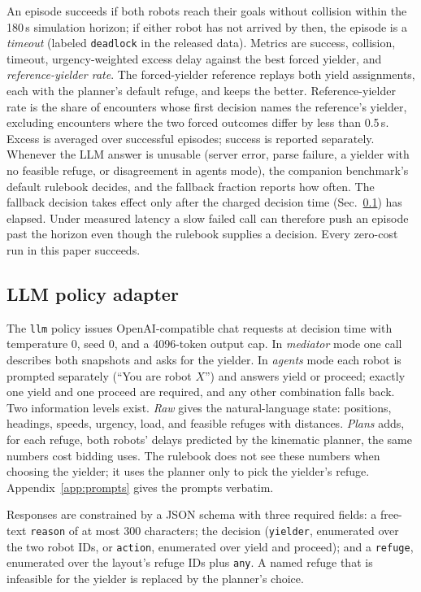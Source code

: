 \documentclass[journal]{IEEEtran}
\begin{document}
An episode succeeds if both robots reach their goals without collision within the 180\,s simulation horizon; if either robot has not arrived by then, the episode is a \emph{timeout} (labeled \texttt{deadlock} in the released data). Metrics are success, collision, timeout, urgency-weighted excess delay against the best forced yielder, and \emph{reference-yielder rate}. The forced-yielder reference replays both yield assignments, each with the planner's default refuge, and keeps the better. Reference-yielder rate is the share of encounters whose first decision names the reference's yielder, excluding encounters where the two forced outcomes differ by less than 0.5\,s. Excess is averaged over successful episodes; success is reported separately. Whenever the LLM answer is unusable (server error, parse failure, a yielder with no feasible refuge, or disagreement in agents mode), the companion benchmark's default rulebook decides, and the fallback fraction reports how often. The fallback decision takes effect only after the charged decision time (Sec.~\ref{sec:adapter}) has elapsed. Under measured latency a slow failed call can therefore push an episode past the horizon even though the rulebook supplies a decision. Every zero-cost run in this paper succeeds.

\subsection{LLM policy adapter}
\label{sec:adapter}
The \texttt{llm} policy issues OpenAI-compatible chat requests at decision time with temperature 0, seed 0, and a 4096-token output cap. In \emph{mediator} mode one call describes both snapshots and asks for the yielder. In \emph{agents} mode each robot is prompted separately (``You are robot $X$'') and answers yield or proceed; exactly one yield and one proceed are required, and any other combination falls back. Two information levels exist. \emph{Raw} gives the natural-language state: positions, headings, speeds, urgency, load, and feasible refuges with distances. \emph{Plans} adds, for each refuge, both robots' delays predicted by the kinematic planner, the same numbers cost bidding uses. The rulebook does not see these numbers when choosing the yielder; it uses the planner only to pick the yielder's refuge. Appendix~\ref{app:prompts} gives the prompts verbatim.

Responses are constrained by a JSON schema with three required fields: a free-text \texttt{reason} of at most 300 characters; the decision (\texttt{yielder}, enumerated over the two robot IDs, or \texttt{action}, enumerated over yield and proceed); and a \texttt{refuge}, enumerated over the layout's refuge IDs plus \texttt{any}. A named refuge that is infeasible for the yielder is replaced by the planner's choice.
\end{document}
